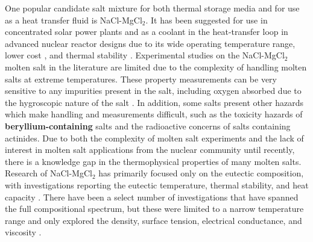 \documentclass[review]{elsarticle}
\providecommand{\DIFaddtex}[1]{{\bf #1}} %
\providecommand{\DIFdeltex}[1]{} %
\providecommand{\DIFaddbegin}{\protect\color{blue}} %
\providecommand{\DIFaddend}{\protect\color{black}} %
\providecommand{\DIFdelbegin}{\protect\color{red}} %
\providecommand{\DIFdelend}{\protect\color{black}} %
\providecommand{\DIFadd}[1]{\texorpdfstring{\DIFaddtex{#1}}{#1}} %
\providecommand{\DIFdel}[1]{\texorpdfstring{\DIFdeltex{#1}}{}} %
\newcommand{\DIFscaledelfig}{0.5}
\newlength{\DIFdelgraphicswidth} %
\newlength{\DIFdelgraphicsheight} %
\newcommand{\DIFaddincludegraphics}[2][]{{\color{blue}\fbox{\DIFOincludegraphics[#1]{#2}}}} %
\newcommand{\DIFdelincludegraphics}[2][]{%
\sbox{\DIFdelgraphicsbox}{\DIFOincludegraphics[#1]{#2}}%
\settoboxwidth{\DIFdelgraphicswidth}{\DIFdelgraphicsbox} %
\settoboxtotalheight{\DIFdelgraphicsheight}{\DIFdelgraphicsbox} %
\scalebox{\DIFscaledelfig}{%
\parbox[b]{\DIFdelgraphicswidth}{\usebox{\DIFdelgraphicsbox}\\[-\baselineskip] \rule{\DIFdelgraphicswidth}{0em}}\llap{\resizebox{\DIFdelgraphicswidth}{\DIFdelgraphicsheight}{%
\setlength{\unitlength}{\DIFdelgraphicswidth}%
\begin{picture}(1,1)%
\thicklines\linethickness{2pt} %
{\color[rgb]{1,0,0}\put(0,0){\framebox(1,1){}}}%
{\color[rgb]{1,0,0}\put(0,0){\line( 1,1){1}}}%
{\color[rgb]{1,0,0}\put(0,1){\line(1,-1){1}}}%
\end{picture}%
}\hspace*{3pt}}} %
} %
\DeclareRobustCommand{\DIFaddbegin}{\DIFOaddbegin \let\includegraphics\DIFaddincludegraphics} %
\DeclareRobustCommand{\DIFaddend}{\DIFOaddend \let\includegraphics\DIFOincludegraphics} %
\DeclareRobustCommand{\DIFdelbegin}{\DIFOdelbegin \let\includegraphics\DIFdelincludegraphics} %
\DeclareRobustCommand{\DIFdelend}{\DIFOaddend \let\includegraphics\DIFOincludegraphics} %
\begin{document}
One popular candidate salt mixture for both thermal storage media and for use as a heat transfer fluid is NaCl-MgCl$_{2}$. It has been suggested for use in concentrated solar power plants and as a coolant in the heat-transfer loop in advanced nuclear reactor designs due to its wide operating temperature range, lower cost \cite{williams2008evaluation}, and thermal stability \cite{XU2020568,williams2006assessment}. Experimental studies on the NaCl-MgCl$_2$ molten salt in the literature are limited due to the complexity of handling molten salts at extreme temperatures. These property measurements can be very sensitive to any impurities present in the salt, including oxygen absorbed due to the hygroscopic nature of the salt \cite{bell2019corrosion}. In addition, some salts present other hazards which make handling and measurements difficult, such as the toxicity hazards of \DIFdelbegin \DIFdel{beryllium containing }\DIFdelend \DIFaddbegin \DIFadd{beryllium-containing }\DIFaddend salts and the radioactive concerns of salts containing actinides. Due to both the complexity of molten salt experiments and the lack of interest in molten salt applications from the nuclear community until recently, there is a knowledge gap in the thermophysical properties of many molten salts. Research of NaCl-MgCl$_{2}$ has primarily focused only on the eutectic composition, with investigations reporting the eutectic temperature, thermal stability, and heat capacity \cite{MOHAN2018156}. There have been a select number of investigations that have spanned the full compositional spectrum, but these were limited to a narrow temperature range and only explored the density, surface tension, electrical conductance, and viscosity \cite{Janz1988}.
\end{document}
